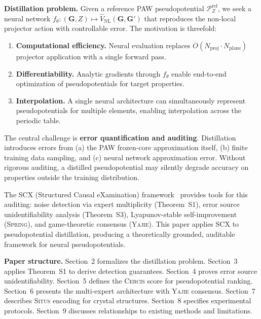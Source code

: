 \documentclass[11pt,a4paper]{article}
\theoremstyle{definition}
\newcommand{\Situs}{\textsc{Situs}}
\newcommand{\Yajie}{\textsc{Yajie}}
\newcommand{\Spring}{\textsc{Spring}}
\newcommand{\Cercis}{\textsc{Cercis}}
\newcommand{\SCX}{\textsc{SCX}}
\newcommand{\ThmSCXNoise}{Theorem~S1}
\newcommand{\ThmSCXHonest}{Theorem~S3}
\begin{document}
\textbf{Distillation problem.} Given a reference PAW pseudopotential $\mathcal{P}_Z^{\mathrm{ref}}$, we seek a neural network $f_\theta: (\mathbf{G}, Z) \mapsto \hat{V}_{\mathrm{NL}}(\mathbf{G}, \mathbf{G}')$ that reproduces the non-local projector action with controllable error. The motivation is threefold:

\begin{enumerate}[label=(\roman*)]
    \item \textbf{Computational efficiency.} Neural evaluation replaces $O(N_{\mathrm{proj}} \cdot N_{\mathrm{plane}})$ projector application with a single forward pass.
    \item \textbf{Differentiability.} Analytic gradients through $f_\theta$ enable end-to-end optimization of pseudopotentials for target properties.
    \item \textbf{Interpolation.} A single neural architecture can simultaneously represent pseudopotentials for multiple elements, enabling interpolation across the periodic table.
\end{enumerate}

The central challenge is \textbf{error quantification and auditing}. Distillation introduces errors from (a) the PAW frozen-core approximation itself, (b) finite training data sampling, and (c) neural network approximation error. Without rigorous auditing, a distilled pseudopotential may silently degrade accuracy on properties outside the training distribution.

The \SCX{} (Structured Causal eXamination) framework~\cite{SCX2025} provides tools for this auditing: noise detection via expert multiplicity (\ThmSCXNoise), error source unidentifiability analysis (\ThmSCXHonest), Lyapunov-stable self-improvement (\Spring), and game-theoretic consensus (\Yajie). This paper applies \SCX{} to pseudopotential distillation, producing a theoretically grounded, auditable framework for neural pseudopotentials.

\textbf{Paper structure.} Section~2 formalizes the distillation problem. Section~3 applies \ThmSCXNoise{} to derive detection guarantees. Section~4 proves error source unidentifiability. Section~5 defines the \Cercis{} score for pseudopotential ranking. Section~6 presents the multi-expert architecture with \Yajie{} consensus. Section~7 describes \Situs{} encoding for crystal structures. Section~8 specifies experimental protocols. Section~9 discusses relationships to existing methods and limitations.

\end{document}
